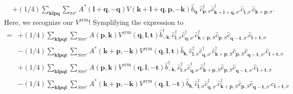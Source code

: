 \begin{align*}
	&+(1/4) \sum_{ \mathbf{k} \mathbf{l} \mathbf{p} \mathbf{q} } \sum_{ \sigma \sigma' } A^*( \mathbf{l}+\mathbf{q}, -\mathbf{q} )  V( \mathbf{k}+\mathbf{l}+\mathbf{q}, \mathbf{p}, -\mathbf{k} )   \hat{b}_{ \mathbf{q}, }^{\phantom{\dagger}} \hat{c}_{ \mathbf{p}, \sigma }^\dagger  \hat{c}_{ \mathbf{k}+\mathbf{l}+\mathbf{q}, \sigma' }^\dagger  \hat{c}_{ \mathbf{l}, \sigma' }^{\phantom{\dagger}} \hat{c}_{ \mathbf{k}+\mathbf{p}, \sigma }^{\phantom{\dagger}} 
. \end{align*}
Here, we recognize our $V^\mathrm{sym}$! Symplifying the expression to
\begin{align*}
	[\eta, H_\mathrm{C}] = 	&+(1/4) \sum_{ \mathbf{k} \mathbf{l} \mathbf{p} \mathbf{q} \mathbf{t} } \sum_{ S \sigma \sigma' } A( \mathbf{p}, \mathbf{k} )  V^\mathrm{sym}( \mathbf{q}, \mathbf{l}, \mathbf{t} )   \hat{b}_{ -\mathbf{k}, }^\dagger  \hat{c}_{ \mathbf{l}, \sigma }^\dagger  \hat{c}_{ \mathbf{q}, \sigma' }^\dagger  \hat{c}_{ \mathbf{k}+\mathbf{p}, S }^\dagger  \hat{c}_{ \mathbf{p}, S }^{\phantom{\dagger}} \hat{c}_{ \mathbf{q}-\mathbf{t}, \sigma' }^{\phantom{\dagger}} \hat{c}_{ \mathbf{l}+\mathbf{t}, \sigma }^{\phantom{\dagger}}  \\
	&-(1/4) \sum_{ \mathbf{k} \mathbf{l} \mathbf{p} \mathbf{q} \mathbf{t} } \sum_{ S \sigma \sigma' } A^*( \mathbf{k}+\mathbf{p}, -\mathbf{k} )  V^\mathrm{sym}( \mathbf{q}, \mathbf{l}, \mathbf{t} )   \hat{b}_{ \mathbf{k}, }^{\phantom{\dagger}} \hat{c}_{ \mathbf{l}, \sigma }^\dagger  \hat{c}_{ \mathbf{q}, \sigma' }^\dagger  \hat{c}_{ \mathbf{k}+\mathbf{p}, S }^\dagger  \hat{c}_{ \mathbf{p}, S }^{\phantom{\dagger}} \hat{c}_{ \mathbf{q}-\mathbf{t}, \sigma' }^{\phantom{\dagger}} \hat{c}_{ \mathbf{l}+\mathbf{t}, \sigma }^{\phantom{\dagger}}  \\
	&+(1/4) \sum_{ \mathbf{k} \mathbf{l} \mathbf{p} \mathbf{q} \mathbf{t} } \sum_{ S \sigma \sigma' } A( \mathbf{p}, \mathbf{k} )  V^\mathrm{sym}( \mathbf{q}, \mathbf{l}, -\mathbf{t} )   \hat{b}_{ -\mathbf{k}, }^\dagger  \hat{c}_{ \mathbf{l}, \sigma }^\dagger  \hat{c}_{ \mathbf{q}, \sigma' }^\dagger  \hat{c}_{ \mathbf{k}+\mathbf{p}, S }^\dagger  \hat{c}_{ \mathbf{p}, S }^{\phantom{\dagger}} \hat{c}_{ \mathbf{q}-\mathbf{t}, \sigma' }^{\phantom{\dagger}} \hat{c}_{ \mathbf{l}+\mathbf{t}, \sigma }^{\phantom{\dagger}}  \\
	&-(1/4) \sum_{ \mathbf{k} \mathbf{l} \mathbf{p} \mathbf{q} \mathbf{t} } \sum_{ S \sigma \sigma' } A^*( \mathbf{k}+\mathbf{p}, -\mathbf{k} )  V^\mathrm{sym}( \mathbf{q}, \mathbf{l}, -\mathbf{t} )   \hat{b}_{ \mathbf{k}, }^{\phantom{\dagger}} \hat{c}_{ \mathbf{l}, \sigma }^\dagger  \hat{c}_{ \mathbf{q}, \sigma' }^\dagger  \hat{c}_{ \mathbf{k}+\mathbf{p}, S }^\dagger  \hat{c}_{ \mathbf{p}, S }^{\phantom{\dagger}} \hat{c}_{ \mathbf{q}-\mathbf{t}, \sigma' }^{\phantom{\dagger}} \hat{c}_{ \mathbf{l}+\mathbf{t}, \sigma }^{\phantom{\dagger}}  \\

\end{align*}
